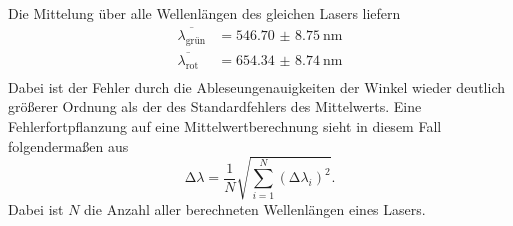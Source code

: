 Die Mittelung über alle Wellenlängen des gleichen Lasers liefern
\begin{align*}
\overline{\lambda_{\text{grün}}} &= \SI{546.70(875)}{\nano\meter}\\
\overline{\lambda_{\text{rot}}} &= \SI{654.34(874)}{\nano\meter}\\
\end{align*}
Dabei ist der Fehler durch die Ableseungenauigkeiten der Winkel wieder deutlich größerer Ordnung als der des Standardfehlers des Mittelwerts. Eine Fehlerfortpflanzung auf eine Mittelwertberechnung
sieht in diesem Fall folgendermaßen aus
\begin{equation}
\increment \lambda = \frac{1}{N} \sqrt{\sum_{i=1}^{N} (\increment \lambda_{i})^2}.
\end{equation}
Dabei ist $N$ die Anzahl aller berechneten Wellenlängen eines Lasers.

%

    